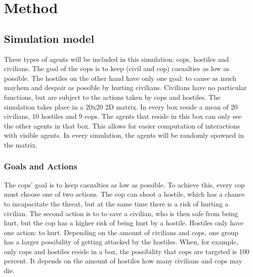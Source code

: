 \section{Method}
\subsection{Simulation model}
Three types of agents will be included in this simulation: cops, hostiles and civilians.
The goal of the cops is to keep (civil and cop) casualties as low as possible.
The hostiles on the other hand have only one goal: to cause as much mayhem and despair as possible by hurting civilians.
Civilians have no particular functions, but are subject to the actions taken by cops and hostiles.
The simulation takes place in a 20x20 2D matrix.
In every box reside a mean of 20 civilians, 10 hostiles and 9 cops.
The agents that reside in this box can only see the other agents in that box.
This allows for easier computation of interactions with visible agents.
In every simulation, the agents will be randomly spawned in the matrix.


\subsubsection{Goals and Actions}
The cops' goal is to keep casualties as low as possible.
To achieve this, every cop must choose one of two actions.
The cop can shoot a hostile, which has a chance to incapacitate the threat, but at the same time there is a risk of hurting a civilian.
The second action is to to save a civilian, who is then safe from being hurt, but the cop has a higher risk of being hurt by a hostile.
Hostiles only have one action: to hurt.
Depending on the amount of civilians and cops, one group has a larger possibility of getting attacked by the hostiles.
When, for example, only cops and hostiles reside in a box, the possibility that cops are targeted is 100 percent.
It depends on the amount of hostiles how many civilians and cops may die.

